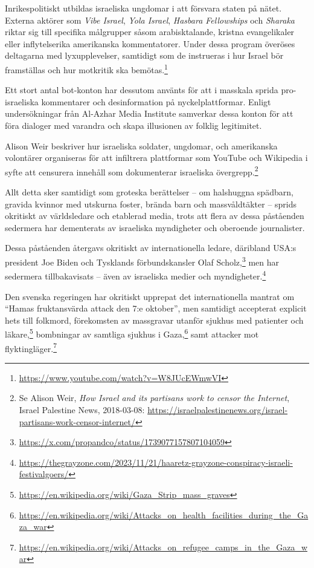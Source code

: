 \documentclass[12pt]{article}
\begin{document}
Inrikespolitiskt utbildas israeliska ungdomar i att försvara staten på nätet. Externa aktörer som \textit{Vibe Israel}, \textit{Yola Israel}, \textit{Hasbara Fellowships} och \textit{Sharaka} riktar sig till specifika målgrupper såsom arabisktalande, kristna evangelikaler eller inflytelserika amerikanska kommentatorer. Under dessa program överöses deltagarna med lyxupplevelser, samtidigt som de instrueras i hur Israel bör framställas och hur motkritik ska bemötas.\footnote{\url{https://www.youtube.com/watch?v=W8JUcEWmwVI}}

Ett stort antal bot-konton har dessutom använts för att i masskala sprida pro-israeliska kommentarer och desinformation på nyckelplattformar. Enligt undersökningar från Al-Azhar Media Institute samverkar dessa konton för att föra dialoger med varandra och skapa illusionen av folklig legitimitet.

Alison Weir beskriver hur israeliska soldater, ungdomar, och amerikanska volontärer organiseras för att infiltrera plattformar som YouTube och Wikipedia i syfte att censurera innehåll som dokumenterar israeliska övergrepp.\footnote{Se Alison Weir, \textit{How Israel and its partisans work to censor the Internet}, Israel Palestine News, 2018-03-08: \url{https://israelpalestinenews.org/israel-partisans-work-censor-internet/}}


Allt detta sker samtidigt som groteska berättelser – om halshuggna spädbarn, gravida kvinnor med utskurna foster, brända barn och massvåldtäkter – sprids okritiskt av världsledare och etablerad media, trots att flera av dessa påståenden sedermera har dementerats av israeliska myndigheter och oberoende journalister.

Dessa påståenden återgavs okritiskt av internationella ledare, däribland USA:s president Joe Biden och Tysklands förbundskansler Olaf Scholz,\footnote{\url{https://x.com/propandco/status/1739077157807104059}} men har sedermera tillbakavisats – även av israeliska medier och myndigheter.\footnote{\url{https://thegrayzone.com/2023/11/21/haaretz-grayzone-conspiracy-israeli-festivalgoers/}}

Den svenska regeringen har okritiskt upprepat det internationella mantrat om \enquote{Hamas fruktansvärda attack den 7:e oktober}, men samtidigt accepterat explicit hets till folkmord, förekomsten av massgravar utanför sjukhus med patienter och läkare,\footnote{\url{https://en.wikipedia.org/wiki/Gaza_Strip_mass_graves}} bombningar av samtliga sjukhus i Gaza,\footnote{\url{https://en.wikipedia.org/wiki/Attacks_on_health_facilities_during_the_Gaza_war}} samt attacker mot flyktingläger.\footnote{\url{https://en.wikipedia.org/wiki/Attacks_on_refugee_camps_in_the_Gaza_war}}
\end{document}
